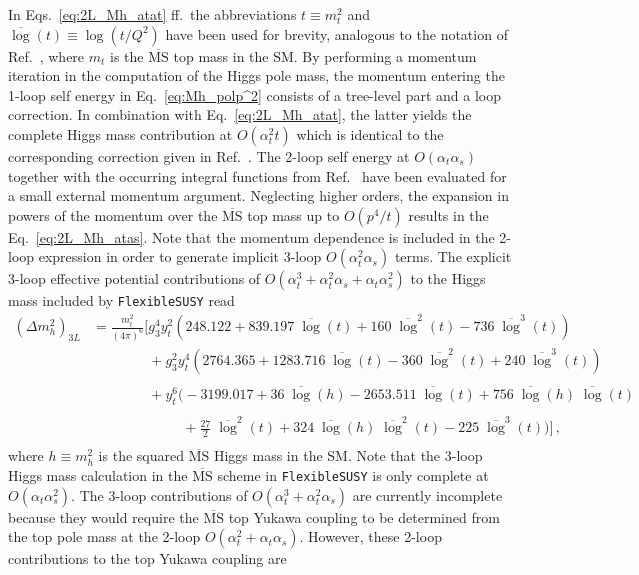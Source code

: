 \documentclass[final,3p,11pt,pdflatex]{elsarticle}
\makeatletter
\newcommand{\fs}{\texttt{FlexibleSUSY}\@\xspace}
\newcommand{\fsbreak}{\texttt{Flex\-ib\-le\-SUSY}\@\xspace}
\newcommand{\ol}[1]{\overline{#1}}
\newcommand{\MSbar}{\ensuremath{\ol{\text{MS}}}\xspace}
\newcommand{\barlog}{\overline{\log}}
\def\at{\alpha_t}
\def\as{\alpha_s}
\makeatother
\begin{document}
%
In Eqs.~\eqref{eq:2L_Mh_atat} ff.\ the abbreviations $t \equiv m_t^2$
and $\barlog(t) \equiv \log(t/Q^2)$ have been used for brevity, 
analogous to the notation of Ref.~\cite{Martin:2014cxa}, where $m_t$ 
is the \MSbar top mass in the SM\@. 
By performing a momentum iteration in the computation of the Higgs 
pole mass, the momentum entering the 1-loop self energy in 
Eq.~\eqref{eq:Mh_polp^2} consists of a tree-level part and a loop 
correction.
In combination with Eq.~\eqref{eq:2L_Mh_atat}, the latter yields the 
complete Higgs mass contribution at $O(\at^2 t)$ which is identical 
to the corresponding correction given in Ref.~\cite{Degrassi:2012ry}.
The 2-loop self energy at $O(\at\as)$ \cite{Martin:2014cxa} together
with the occurring integral functions from Ref.~\cite{Martin:2003qz}
have been evaluated for a small external momentum argument. Neglecting
higher orders, the expansion in powers of the momentum over the \MSbar
top mass up to $O(p^4/t)$ results in the Eq.~\eqref{eq:2L_Mh_atas}. 
Note that the momentum dependence is included in the 2-loop expression 
in order to generate implicit 3-loop $O(\at^2\as)$ terms.
%
The explicit 3-loop effective potential contributions of
$O(\at^3 + \at^2 \as + \at \as^2)$ to the
Higgs mass included by \fs read
%
\begin{align}
  (\Delta m_h^2)_{3L} &=
  \frac{m_t^2}{(4\pi)^6} \Bigg[
     g_3^4 y_t^2 \left(248.122 + 839.197 \;\barlog(t) + 160 \;\barlog^2(t) - 736 \;\barlog^3(t)\right) \nonumber \\
     &\phantom{=\frac{m_t^2}{(4\pi)^6} \Bigg[}
     + g_3^2 y_t^4 \left(2764.365 + 1283.716 \;\barlog(t) - 360 \;\barlog^2(t) + 240 \;\barlog^3(t)\right) \nonumber \\
     &\phantom{=\frac{m_t^2}{(4\pi)^6} \Bigg[}
     + y_t^6 \Big(-3199.017 + 36 \;\barlog(h) - 2653.511 \;\barlog(t) + 756 \;\barlog(h) \;\barlog(t) \nonumber \\
     &\phantom{=\frac{m_t^2}{(4\pi)^6} \Bigg[}\qquad~~
     + \frac{27}{2} \;\barlog^2(t) + 324 \;\barlog(h) \;\barlog^2(t) - 225 \;\barlog^3(t)\Big)
  \Bigg] \,,
\end{align}
%
where $h\equiv m_h^2$ is the squared \MSbar Higgs mass in the SM\@.
Note that the 3-loop Higgs mass calculation in
the \MSbar scheme in \fsbreak is only complete at $O(\at\as^2)$.  The
3-loop contributions of $O(\at^3 + \at^2 \as)$ are currently incomplete
because they would require the \MSbar top Yukawa coupling to be determined
from the top pole mass at the 2-loop $O(\at^2 + \at\as)$.
However, these 2-loop contributions to the top Yukawa coupling are
\end{document}
